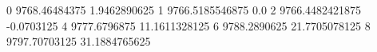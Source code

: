 0 9768.46484375 1.9462890625
1 9766.5185546875 0.0
2 9766.4482421875 -0.0703125
4 9777.6796875 11.1611328125
6 9788.2890625 21.7705078125
8 9797.70703125 31.1884765625
